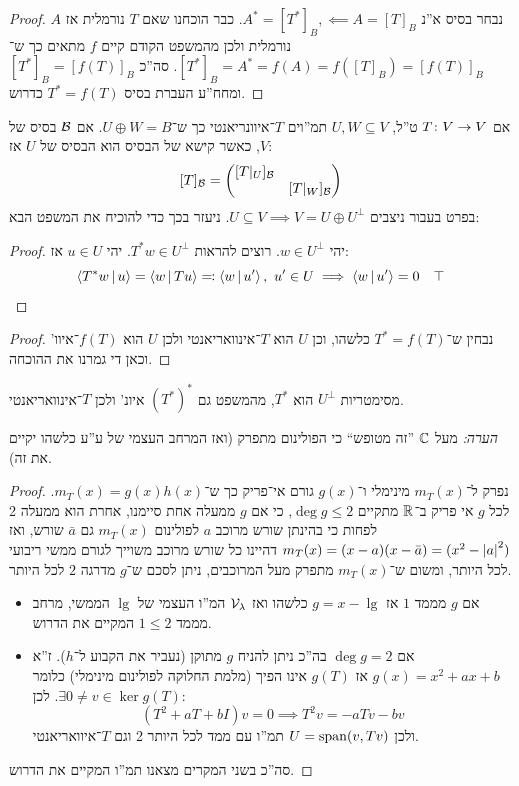 \documentclass[name=רשימות אלגברה לינארית 2א]{../../../tex/classes/megasumPreamble}
\begin{document}
	\begin{proof}
		נבחר בסיס א''נ $A^* = [T^*]_B, \impliedby A = [T]_B$. כבר הוכחנו שאם $T$ נורמלית אז $A$ נורמלית ולכן מהמשפט הקודם קיים $f$ מתאים כך ש־$[T^*]_B = A^* = f(A) = f([T]_B) = [f(T)]_B$. סה''כ $[T^*]_B = [f(T)]_B$ ומחח''ע העברת בסיס $T^* = f(T)$ כדרוש. 
	\end{proof}
	
	אם $T \colon V \to V$ ט''ל, $U, W \subseteq V$ תמ''וים $T$־איוונריאנטי כך ש־$U \oplus W = B$. אם $\mathcal{B}$ בסיס של $V$, כאשר קישא של הבסיס הוא הבסיס של $U$ אז: 
	\[ [T]_{\mathcal{B}} = \begin{pmatrix} [T|_U]_{\mathcal{B}} &  \\  & [T|_W]_{\mathcal{B}} \end{pmatrix} \]
	בפרט בעבור ניצבים $U \subseteq V \implies V = U \oplus U^{\perp}$. ניעזר בכך כדי להוכיח את המשפט הבא: 
	\begin{proof}
		יהי $w \in U^{\perp}$. רוצים להראות $T^*w \in U^{\perp}$. יהי $u \in U$ אז: 
		\[ \left \langle T^* w \,\middle|\, u \right \rangle = \left \langle w \,\middle|\, Tu \right \rangle \eqqcolon \left \langle w \,\middle|\, u' \right \rangle, \ u' \in U \implies \left \langle w \,\middle|\, u' \right \rangle = 0 \quad \top \]\mathenvendproof
	\end{proof}
	\begin{proof}
		נבחין ש־$T^* = f(T)$ כלשהו, וכן $U$ הוא $T$־אינוואריאנטי ולכן $U$ הוא $f(T)$־איוו' וכאן די גמרנו את ההוכחה. 
	\end{proof}
	מסימטריות $U^{\perp}$ הוא $T^*$, מהמשפט גם $(T^*)^*$ איונ' ולכן $T$־אינוואריאנטי. 
	
	
	\textit{הערה: }מעל $\mathbb{C}$ ''זה מטופש`` כי הפולינום מתפרק (ואז המרחב העצמי של ע''ע כלשהו יקיים את זה). 
	\begin{proof}
		נפרק ל־$m_T(x)$ מינימלי ו־$g(x)$ גורם אי־פריק כך ש־$m_T(x) = g(x)h(x)$. לכל $g$ אי פריק ב־$\mathbb{R}$ מתקיים $\deg g \le 2$, כי אם $g$ ממעלה אחת סיימנו, אחרת הוא ממעלה 2 לפחות כי בהינתן שורש מרוכב $a$ לפולינום $m_T(x)$ גם $\bar a$ שורש, ואז $m_T(x) = (x - a)(x - \bar a) = (x^2 - \left \lvert a \right \rvert^2)$ דהיינו כל שורש מרוכב משוייך לגורם ממשי ריבועי לכל היותר, ומשום ש־$m_T(x)$ מתפרק מעל המרוכבים, ניתן לסכם ש־$g$ מדרגה $2$ לכל היותר. 
		\begin{itemize}
			\item אם $g$ מממד $1$ אז $g = x - \lg$ כלשהו ואז $\mathcal{V}_{\lambda}$ המ''ו העצמי של $\lg$ הממשי, מרחב מממד $1 \le 2$ המקיים את הדרוש. 
			\item אם $\deg g = 2$ בה''כ ניתן להניח $g$ מתוקן (נעביר את הקבוע ל־$h$). ז''א $g(x) = x^2 + ax + b$ אז $g(T)$ אינו הפיך (מלמת החלוקה לפולינום מינימלי) כלומר $\exists 0 \neq v \in \ker g(T)$. 
			לכן: 
			\[ (T^2 + aT + bI)v = 0 \implies T^2v = -a T v - bv \]
			ולכן $U = \operatorname{span}(v, Tv)$ תמ''ו עם ממד לכל היותר 2 וגם $T$־איוואריאנטי. 
		\end{itemize}סה''כ בשני המקרים מצאנו תמ''ו המקיים את הדרוש. 
	\end{proof}
	
\end{document}
